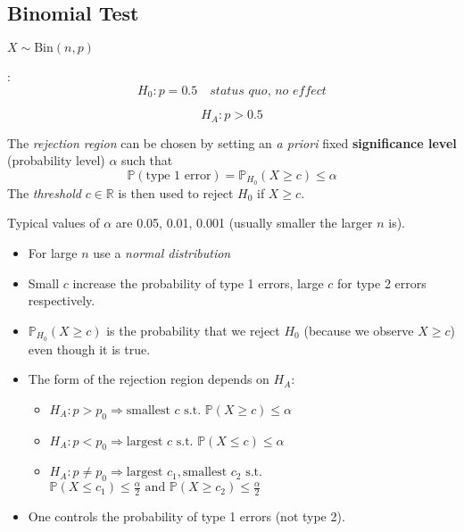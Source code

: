 
\renewcommand{\arraystretch}{1}
\setlength\tabcolsep{\oldtabcolsep}

\subsection{Binomial Test}
$X\sim \mathrm{Bin}(n,p)$

:
\noindent\begin{equation*}
    H_0: p=0.5\quad \textit{status quo, no effect}
\end{equation*}

\noindent\begin{equation*}
    H_A: p>0.5
\end{equation*}


The \textit{rejection region} can be chosen by setting an \textit{a priori} fixed \textbf{significance level} (probability level) $\alpha$ such that
\noindent\begin{equation*}
    \mathbb{P}(\text{type 1 error}) = \mathbb{P}_{H_0}(X\geq c) \leq \alpha
\end{equation*}
The \textit{threshold} $c\in \mathbb{R}$ is then used to reject $H_0$ if $X\geq c$.

Typical values of $\alpha$ are 0.05, 0.01, 0.001 (usually smaller the larger $n$ is).

\newpar{}
\begin{itemize}
    \item For large $n$ use a \textit{normal distribution}
    \item Small $c$ increase the probability of type 1 errors, large $c$ for type 2 errors respectively.
    \item $\mathbb{P}_{H_0}(X\geq c)$ is the probability that we reject $H_0$ (because we observe $X\geq c$) even though it is true.
    \item The form of the rejection region depends on $H_A$:
          \begin{itemize}
              \item $H_A: p>p_0 \Rightarrow \text{smallest }c\text{ s.t. } \mathbb{P}(X\geq c)\leq \alpha$
              \item $H_A: p<p_0 \Rightarrow \text{largest }c\text{ s.t. } \mathbb{P}(X\leq c)\leq \alpha$
              \item $H_A: p\neq p_0 \Rightarrow \text{largest } c_1, \text{smallest }c_2 \text{ s.t.}$\newline
                    $ \mathbb{P}(X\leq c_1)\leq \frac{\alpha}{2} \text{ and }\mathbb{P}(X\geq c_2)\leq \frac{\alpha}{2}$
          \end{itemize}
    \item One controls the probability of type 1 errors (not type 2).
\end{itemize}

